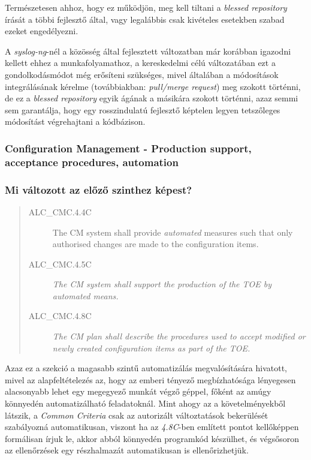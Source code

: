 Természetesen ahhoz, hogy ez működjön, meg kell tiltani a \emph{blessed repository} írását a
többi fejlesztő által, vagy legalábbis csak kivételes esetekben szabad ezeket engedélyezni.

A \emph{syslog-ng}-nél a közösség által fejlesztett változatban már korábban igazodni kellett
ehhez a munkafolyamathoz, a kereskedelmi célú változatában ezt a gondolkodásmódot még erősíteni
szükséges, mivel általában a módosítások integrálásának kérelme (továbbiakban: \emph{pull/merge request})
meg szokott történni, de ez a \emph{blessed repository} egyik ágának a másikára szokott történni,
azaz semmi sem garantálja, hogy egy rosszindulatú fejlesztő képtelen legyen tetszőleges módosítást
végrehajtani a kódbázison.

\pagebreak[1]
\subsubsection{Configuration Management - Production support, acceptance procedures, automation}
\subsubsection{Mi változott az előző szinthez képest?}
\begin{quote}
    \begin{description}
        \item[ALC\_CMC.4.4C]{The CM system shall provide \emph{automated} measures such that only
            authorised changes are made to the configuration items.}
        \item[ALC\_CMC.4.5C]{\emph{The CM system shall support the production of the TOE by
            automated means.}}
        \item[ALC\_CMC.4.8C]{\emph{The CM plan shall describe the procedures used to accept
            modified or newly created configuration items as part of the TOE.}}
    \end{description}
\end{quote}
Azaz ez a szekció a magasabb szintű automatizálás megvalósítására hivatott, mivel az alapfeltételezés
az, hogy az emberi tényező megbízhatósága lényegesen alacsonyabb lehet egy megegyező munkát végző
géppel, főként az amúgy könnyedén automatizálható feladatoknál.
Mint ahogy az a követelményekből látszik, a \emph{Common Criteria} csak az autorizált változtatások
bekerülését szabályozná automatikusan, viszont ha az \emph{4.8C}-ben említett pontot kellőképpen
formálisan írjuk le, akkor abból könnyedén programkód készülhet, és végsősoron az ellenőrzések egy
részhalmazát automatikusan is ellenőrizhetjük.

